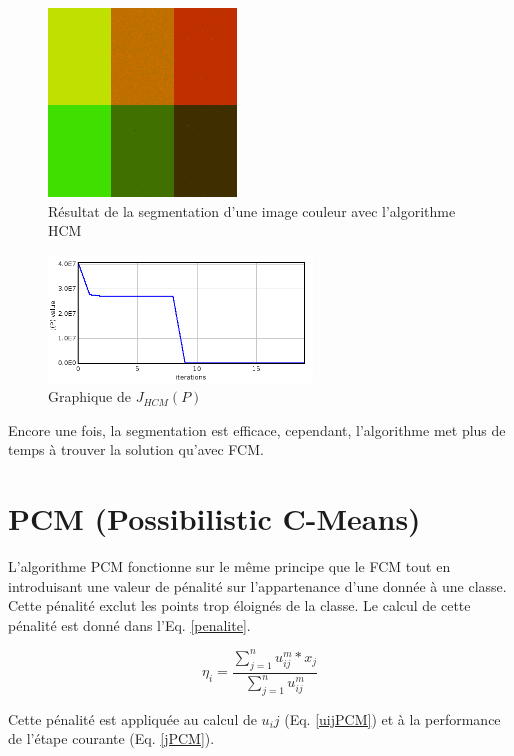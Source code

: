 \documentclass[a4paper,11pt]{article}
\begin{document}
\begin{figure}[!h]
  \begin{center}
    \includegraphics[width=5cm]{resultat/HCM.png}
    \caption{Résultat de la segmentation d'une image couleur avec l'algorithme HCM}
    \label{fig:hcm}
  \end{center}
\end{figure}

\begin{figure}[!h]
  \begin{center}
    \includegraphics[width=7cm]{resultat/HCM_graph.png}
    \caption{Graphique de $J_{HCM}(P)$}
    \label{fig:graphHCM}
  \end{center}
\end{figure}

Encore une fois, la segmentation est efficace, cependant, l'algorithme met plus de temps
à trouver la solution qu'avec FCM.
\newpage
\section{PCM (Possibilistic C-Means)}
L'algorithme PCM fonctionne sur le même principe que le FCM tout en introduisant une valeur de pénalité
sur l'appartenance d'une donnée à une classe. Cette pénalité exclut les points trop éloignés de la classe. 
Le calcul de cette pénalité est donné dans l'Eq. \ref{penalite}.

\begin{equation}
  \label{penalite}
  \eta_i = \frac{\sum_{j=1}^{n} u_{ij}^m * x_j}{\sum_{j=1}^{n} u_{ij}^m}
\end{equation}

Cette pénalité est appliquée au calcul de $u_ij$ (Eq. \ref{uijPCM}) et à la performance de l'étape courante (Eq. \ref{jPCM}).
\end{document}
